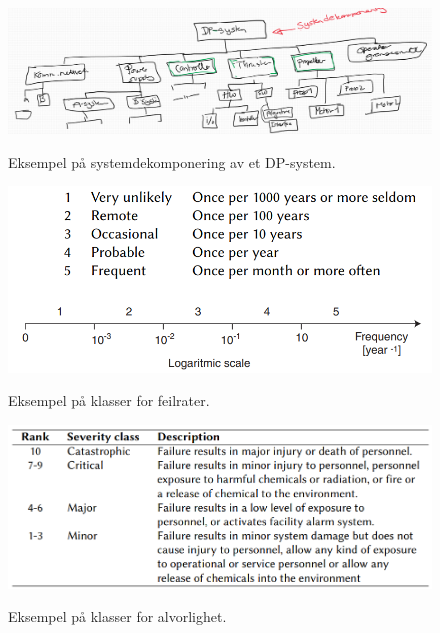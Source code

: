 \begin{figure}[H]
    \centering
        \includegraphics[width=\textwidth]{figures/FMECA/fmeca.PNG}\\
        \caption{Eksempel på systemdekomponering av et DP-system.}
        \label{fig:decomp}
\end{figure}

\begin{figure}[H]
    \centering
        \includegraphics[width=\textwidth]{figures/FMECA/freq.PNG}\\
        \caption{Eksempel på klasser for feilrater.}
        \label{fig:feilrate}
\end{figure}

\begin{figure}[H]
    \centering
        \includegraphics[width=\textwidth]{figures/FMECA/sever.PNG}\\
        \caption{Eksempel på klasser for alvorlighet.}
        \label{fig:alvor}
\end{figure}


